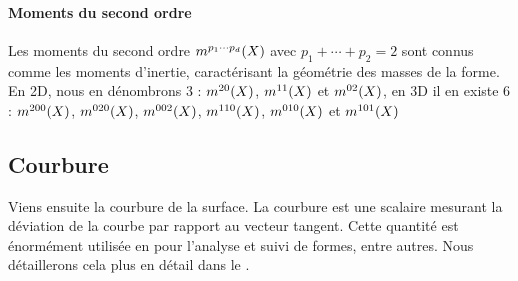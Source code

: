 \paragraph{Moments du second ordre}
%
Les moments du second ordre $m^{p_1 \cdots p_d}(X)$ avec $p_1 + \cdots +
p_2 = 2$ sont connus comme les moments d'inertie, caractérisant la géométrie des
masses de la forme. En 2D, nous en dénombrons 3 : $m^{2 0}(X)$, $m^{1
1}(X)$ et $m^{0 2}(X)$, en 3D il en existe 6 :  $m^{2 0
0}(X)$, $m^{0 2 0}(X)$, $m^{0 0 2}(X)$, $m^{1 1
0}(X)$, $m^{0 1 0}(X)$ et $m^{1 0 1}(X)$
%
\subsection{Courbure}
%
Viens ensuite la courbure de la surface. La courbure est une scalaire mesurant la déviation de la courbe par rapport au vecteur tangent. Cette quantité est énormément utilisée en \GeometryProcessing pour l'analyse et suivi de formes, entre autres. Nous détaillerons cela plus en détail dans le .



